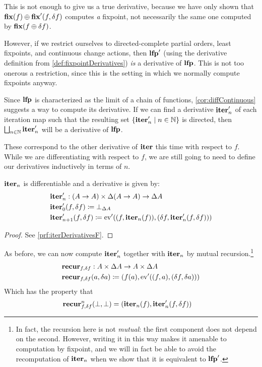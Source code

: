 This is not enough to give us a true derivative, because we have only shown
that $\mathbf{fix}(f) \oplus \mathbf{fix}'(f, \delta f)$ computes \emph{a} fixpoint, not necessarily
the same one computed by $\mathbf{fix}{(f \oplus \delta f)}$.

However, if we restrict ourselves to directed-complete partial orders, least
fixpoints, and continuous change actions, then $\mathbf{lfp}'$ (using the
derivative definition from \cref{def:fixpointDerivatives}) \emph{is} a
derivative of $\mathbf{lfp}$. This is not too onerous a restriction, since this is
the setting in which we normally compute fixpoints anyway.

Since $\mathbf{lfp}$ is characterized as the limit of a chain of functions,
\cref{cor:diffContinuous} suggests a way to compute its derivative. If we can find a derivative
$\mathbf{iter}_n'$ of each iteration map 
such that the resulting set $\{ \mathbf{iter}_n' \mid n \in \mathbb{N}\}$ is directed, then $\bigsqcup_{n \in \mathbb{N}}\mathbf{iter}_n'$ will be a derivative of $\mathbf{lfp}$.

These correspond to the other derivative of $\mathbf{iter}$ \textemdash{} this time with respect to
$f$. While we are differentiating with respect to $f$, we are still going to
need to define our derivatives inductively in terms of $n$.

\begin{prop}[name=Derivative of the iteration map with respect to $f$, restate=iterDerivativesF]
  \label{prop:iterDerivativesF}
  $\mathbf{iter}_n$ is differentiable and a derivative is given by:
  \begin{align*}
    &\mathbf{iter}_n' : (A \rightarrow A) \times \Delta (A \rightarrow A) \rightarrow \Delta A\\
    &\mathbf{iter}_0' (f, \delta f) \coloneqq \bot_{\Delta A}\\
    &\mathbf{iter}_{n+1}' (f, \delta f) \coloneqq \operatorname{ev}'((f, \mathbf{iter}_n(f)), (\delta f, \mathbf{iter}_n'(f, \delta f)))
  \end{align*}
\end{prop}
\ifproofs
\begin{proof}
  See \cref{prf:iterDerivativesF}.
\end{proof}
\fi

As before, we can now compute $\mathbf{iter}_n'$ together with $\mathbf{iter}_n$ by
mutual recursion.\footnote{
  In fact, the recursion here is not \emph{mutual}: the first component does not
  depend on the second. However, writing it in this way makes it
  amenable to computation by fixpoint, and we will in fact be able to avoid the
  recomputation of $\mathbf{iter}_n$ when we show that it is equivalent to $\mathbf{lfp}'$.
}
\begin{align*}
  &\mathbf{recur}_{f, \delta f} : A \times \Delta A \rightarrow A \times \Delta A\\
  &\mathbf{recur}_{f, \delta f} (a, \delta a) \coloneqq (f(a), \operatorname{ev}'((f, a), (\delta f, \delta a)))
\end{align*}
Which has the property that
\begin{align*}
  &\mathbf{recur}_{f, \delta f}^n (\bot, \bot) = (\mathbf{iter}_n(f), \mathbf{iter}_n'(f, \delta f))
\end{align*}

